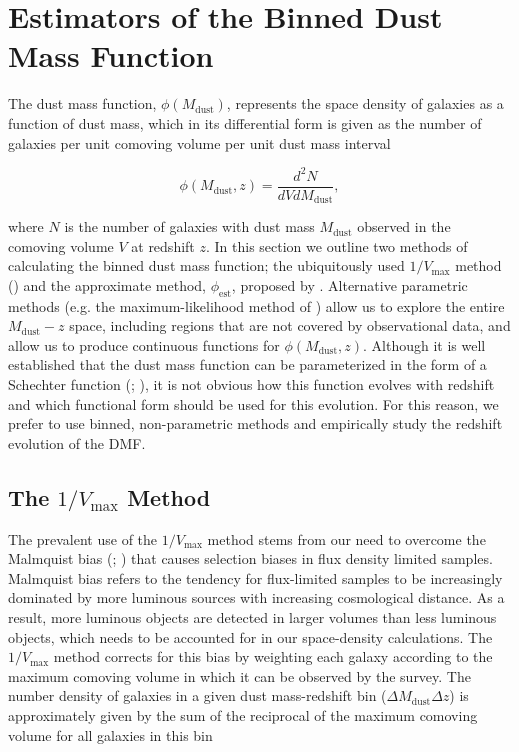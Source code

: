 \section{Estimators of the Binned Dust Mass Function}
\label{sec:dmf_estimators}

The dust mass function, $\phi(M_{\textrm{dust}})$, represents the space density of galaxies as a function of dust mass, which in its differential form is given as the number of galaxies per unit comoving volume per unit dust mass interval

\begin{equation}
    \phi(M_{\textrm{dust}}, z) = \frac{d^2N}{dV dM_{\textrm{dust}}},
\label{eq:differential_phi}
\end{equation}

\noindent where $N$ is the number of galaxies with dust mass $M_{\textrm{dust}}$ observed in the comoving volume $V$ at redshift $z$. In this section we outline two methods of calculating the binned dust mass function; the ubiquitously used $1/V_{\textrm{max}}$ method \mbox{(\citealt{Schmidt_1968, Felten_1976, Avni_1980})} and the approximate method, $\phi_{\textrm{est}}$, proposed by \citealt{Page_2000}. Alternative parametric methods (e.g. the maximum-likelihood method of \citealt{Marshall_1983}) allow us to explore the entire $M_{\textrm{dust}} - z$ space, including regions that are not covered by observational data, and allow us to produce continuous functions for $\phi(M_{\textrm{dust}}, z)$. Although it is well established that the dust mass function can be parameterized in the form of a Schechter function (\citealt{Press_1974}; \citealt{Schechter_1976}), it is not obvious how this function evolves with redshift and which functional form should be used for this evolution. For this reason, we prefer to use binned, non-parametric methods and empirically study the redshift evolution of the DMF.

\subsection{The $1/V_{\textrm{max}}$ Method}

The prevalent use of the $1/V_{\textrm{max}}$ method stems from our need to overcome the Malmquist bias (\citealt{Eddington_1914}; \citealt{Malmquist_1922}) that causes selection biases in flux density limited samples. Malmquist bias refers to the tendency for flux-limited samples to be increasingly dominated by more luminous sources with increasing cosmological distance. As a result, more luminous objects are detected in larger volumes than less luminous objects, which needs to be accounted for in our space-density calculations. The $1/V_{\textrm{max}}$ method corrects for this bias by weighting each galaxy according to the maximum comoving volume in which it can be observed by the survey. The number density of galaxies in a given dust mass-redshift bin ($\Delta M_{\textrm{dust}} \Delta z$) is approximately given by the sum of the reciprocal of the maximum comoving volume for all galaxies in this bin

